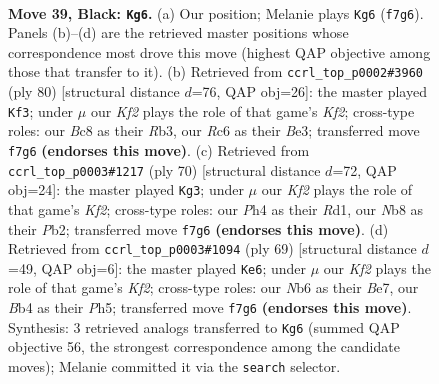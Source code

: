 \documentclass[11pt]{article}
\begin{document}
\clearpage

\begin{figure}[p]\centering
\begin{subfigure}{0.46\textwidth}\centering
\resizebox{\linewidth}{!}{%
\newchessgame
\chessboard[
  setfen={1nb5/1p3k2/1nr2p2/pN1p2p1/1b4Pp/1P2P2P/PB2PK2/R2B4 b - - 13 39},
  showmover=false,
  pgfstyle=straightmove, color=movearrow, markmove={f7-g6}
]}
\caption{}
\end{subfigure}\hfill
\begin{subfigure}{0.46\textwidth}\centering
\resizebox{\linewidth}{!}{%
\newchessgame
\chessboard[
  setfen={6k1/rpb2p2/2p1n1p1/p1P4p/N3P3/PR2B1PP/1P3K2/8 w - - 5 41},
  showmover=false,
  pgfstyle=straightmove, color=movearrow, markmove={f2-f3}
]}
\caption{}
\end{subfigure}
\\[4pt]
\begin{subfigure}{0.46\textwidth}\centering
\resizebox{\linewidth}{!}{%
\newchessgame
\chessboard[
  setfen={1r6/n4p2/1p1kb2p/p2p2pP/3P2P1/P3NP2/1PB2K2/3R4 w - - 1 36},
  showmover=false,
  pgfstyle=straightmove, color=movearrow, markmove={f2-g3}
]}
\caption{}
\end{subfigure}\hfill
\begin{subfigure}{0.46\textwidth}\centering
\resizebox{\linewidth}{!}{%
\newchessgame
\chessboard[
  setfen={8/1p1rbk2/p4np1/3pBp1p/3P3P/P2K1PP1/1PR3B1/8 b - - 1 35},
  showmover=false,
  pgfstyle=straightmove, color=movearrow, markmove={f7-e6}
]}
\caption{}
\end{subfigure}
\caption{\textbf{Move 39, Black: \texttt{Kg6}.} (a) Our position; Melanie plays \texttt{Kg6} (\texttt{f7g6}). Panels (b)--(d) are the retrieved master positions whose correspondence most drove this move (highest QAP objective among those that transfer to it). (b) Retrieved from \texttt{ccrl\_top\_p0002\#3960} (ply 80) [structural distance $d$=76, QAP obj=26]: the master played \texttt{Kf3}; under $\mu$ our \emph{Kf2} plays the role of that game's \emph{Kf2}; cross-type roles: our \emph{B}c8 as their \emph{R}b3, our \emph{R}c6 as their \emph{B}e3; transferred move \texttt{f7g6} \textbf{(endorses this move)}. (c) Retrieved from \texttt{ccrl\_top\_p0003\#1217} (ply 70) [structural distance $d$=72, QAP obj=24]: the master played \texttt{Kg3}; under $\mu$ our \emph{Kf2} plays the role of that game's \emph{Kf2}; cross-type roles: our \emph{P}h4 as their \emph{R}d1, our \emph{N}b8 as their \emph{P}b2; transferred move \texttt{f7g6} \textbf{(endorses this move)}. (d) Retrieved from \texttt{ccrl\_top\_p0003\#1094} (ply 69) [structural distance $d$=49, QAP obj=6]: the master played \texttt{Ke6}; under $\mu$ our \emph{Kf2} plays the role of that game's \emph{Kf2}; cross-type roles: our \emph{N}b6 as their \emph{B}e7, our \emph{B}b4 as their \emph{P}h5; transferred move \texttt{f7g6} \textbf{(endorses this move)}. Synthesis: 3 retrieved analogs transferred to \texttt{Kg6} (summed QAP objective 56, the strongest correspondence among the candidate moves); Melanie committed it via the \texttt{search} selector.}
\label{fig:thought-m77}
\end{figure}
\end{document}
